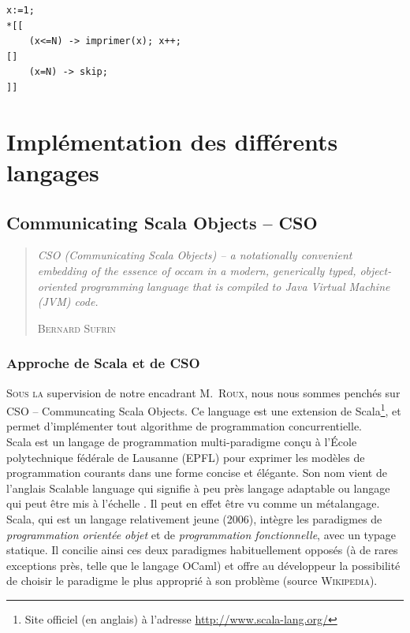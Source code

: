 \documentclass[a4paper,11pt,french]{report}
\begin{document}
\begin{lstlisting}[frame=trBL]
x:=1;
*[[
	(x<=N) -> imprimer(x); x++;
[]
	(x=N) -> skip;
]]
\end{lstlisting}




\part{Implémentation des différents langages}
\chapter[CSO]{Communicating Scala Objects -- CSO}
\begin{quotation}
\textit{\og CSO (Communicating Scala Objects) – a notationally convenient embedding of the essence of occam in a modern, generically typed, object-oriented programming language that is compiled to Java Virtual Machine (JVM) code.\fg}
\begin{flushright}
\textsc{Bernard Sufrin}
\end{flushright}
\end{quotation}
\bigskip
\section{Approche de Scala et de CSO}

\lettrine{S}{ous la} supervision de notre encadrant M.\ \textsc{Roux}, nous nous sommes penchés sur CSO -- Communcating Scala Objects. Ce language est une extension de Scala\footnote{Site officiel (en anglais) à l'adresse \url{http://www.scala-lang.org/}}, et permet d'implémenter tout algorithme de programmation concurrentielle.\\

Scala est un langage de programmation multi-paradigme conçu à l'École polytechnique fédérale de Lausanne (EPFL) pour exprimer les modèles de programmation courants dans une forme concise et élégante. Son nom vient de l'anglais Scalable language qui signifie à peu près \og langage adaptable \fg ou \og langage qui peut être mis à l'échelle \fg. Il peut en effet être vu comme un métalangage.
Scala, qui est un langage relativement jeune (2006), intègre les paradigmes de \emph{programmation orientée objet} et de \emph{programmation fonctionnelle}, avec un typage statique. Il concilie ainsi ces deux paradigmes habituellement opposés (à de rares exceptions près, telle que le langage OCaml) et offre au développeur la possibilité de choisir le paradigme le plus approprié à son problème (source \textsc{Wikipedia}).\\
\end{document}
